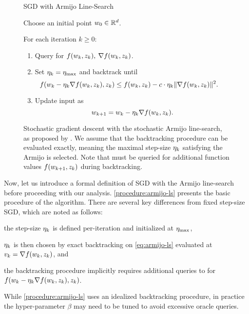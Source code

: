 \begin{figure}[t]
    \begin{procedure}{\ac{SGD} with Armijo Line-Search}
    \item Choose an initial point \( w_0 \in \mathbb{R}^d \).
    \item For each iteration \( k \geq 0 \):
        \begin{enumerate}
            \item Query \oracle{} for \( f(w_k, z_{k}), \: \nabla f(w_k, z_{k}) \). 
            \item Set \( \eta_k =  \eta_{\text{max}} \) and backtrack until 
                \[  \hspace{-1em} f(w_k - \eta_k \nabla f(w_k, z_{k}), z_{k}) \leq f(w_k, z_{k}) - c \cdot \eta_k \|\nabla f(w_k, z_{k})\|^2. \]
            \item Update input as\vspace{-1ex}%
                \[ w_{k+1} = w_k - \eta_k \nabla f(w_k, z_{k}). \]
        \end{enumerate}
    \end{procedure}
    \caption[Procedural definition of stochastic gradient descent with the stochastic Armijo line-search.]%
       {Stochastic gradient descent with the stochastic Armijo line-search, as proposed by \citet{vaswani2019painless}.
        We assume that the backtracking procedure can be evaluated exactly, meaning the maximal step-size \( \eta_k \) satisfying the Armijo is selected.
        Note that \oracle{} must be queried for additional function values \( f(w_{k+1}, z_{k}) \) during backtracking.}%
    \label{procedure:armijo-ls}
\end{figure}

Now, let us introduce a formal definition of \ac{SGD} with the Armijo line-search before proceeding with our analysis.
\autoref{procedure:armijo-ls} presents the basic procedure of the algorithm.
There are several key differences from fixed step-size \ac{SGD}, which are noted as follows:
\begin{inparaenum}[(i)]
    \item the step-size \( \eta_k \) is defined per-iteration and initialized at \( \eta_{\text{max}} \),
    \item \( \eta_k \) is then chosen by exact backtracking on \autoref{eq:armijo-ls} evaluated at \( v_k = \nabla f(w_k, z_{k}) \), and
    \item the backtracking procedure implicitly requires additional queries to \oracle{} for \( f(w_k - \eta_k \nabla f(w_k, z_{k}), z_{k}) \).
\end{inparaenum}
While \autoref{procedure:armijo-ls} uses an idealized backtracking procedure, in practice the hyper-parameter \( \beta \) may need to be tuned to avoid excessive oracle queries. 

